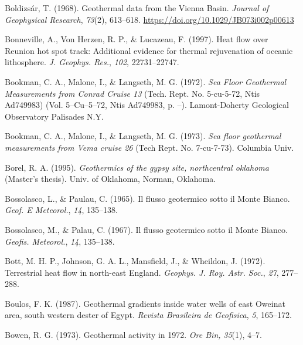 \documentclass[draft,linenumbers]{agujournal2018}
\begin{document}
\leavevmode{}%
Boldizsár, T. (1968). Geothermal data from the {Vienna Basin}.
\emph{Journal of Geophysical Research}, \emph{73}(2), 613--618.
\url{https://doi.org/10.1029/JB073i002p00613}

\leavevmode{}%
Bonneville, A., Von Herzen, R. P., \& Lucazeau, F. (1997). Heat flow
over {Reunion} hot spot track: Additional evidence for thermal
rejuvenation of oceanic lithosphere. \emph{J. Geophys. Res.},
\emph{102}, 22731--22747.

\leavevmode{}%
Bookman, C. A., Malone, I., \& Langseth, M. G. (1972). \emph{{Sea Floor
Geothermal Measurements from Conrad Cruise 13}} (Tech. Rept. No.
5-cu-5-72, Ntis Ad749983) (Vol. 5--Cu--5--72, Ntis Ad749983, p. --).
Lamont-Doherty Geological Observatory Palisades N.Y.

\leavevmode{}%
Bookman, C. A., Malone, I., \& Langseth, M. G. (1973). \emph{Sea floor
geothermal measurements from {Vema} cruise 26} (Tech Rept. No.
7-cu-7-73). Columbia Univ.

\leavevmode{}%
Borel, R. A. (1995). \emph{Geothermics of the gypsy site, northcentral
oklahoma} (Master's thesis). Univ. of Oklahoma, Norman, Oklahoma.

\leavevmode{}%
Bossolasco, L., \& Paulau, C. (1965). Il flusso geotermico sotto il
{Monte Bianco}. \emph{Geof. E Meteorol.}, \emph{14}, 135--138.

\leavevmode{}%
Bossolasco, M., \& Palau, C. (1967). Il flusso geotermico sotto il
{Monte Bianco}. \emph{Geofis. Meteorol.}, \emph{14}, 135--138.

\leavevmode{}%
Bott, M. H. P., Johnson, G. A. L., Mansfield, J., \& Wheildon, J.
(1972). Terrestrial heat flow in north-east {England}. \emph{Geophys. J.
Roy. Astr. Soc.}, \emph{27}, 277--288.

\leavevmode{}%
Boulos, F. K. (1987). Geothermal gradients inside water wells of east
{Oweinat} area, south western dester of {Egypt}. \emph{Revista
Brasileira de Geofisica}, \emph{5}, 165--172.

\leavevmode{}%
Bowen, R. G. (1973). Geothermal activity in 1972. \emph{Ore Bin,}
\emph{35}(1), 4--7.
\end{document}
